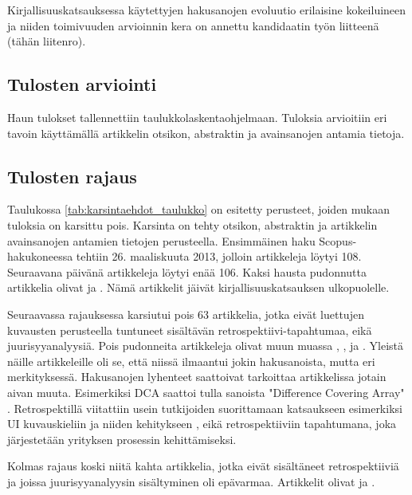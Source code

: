 Kirjallisuuskatsauksessa käytettyjen hakusanojen evoluutio erilaisine kokeiluineen ja niiden toimivuuden arvioinnin kera on annettu kandidaatin työn liitteenä (tähän liitenro).

\subsection{Tulosten arviointi}
Haun tulokset tallennettiin taulukkolaskentaohjelmaan. Tuloksia arvioitiin eri tavoin käyttämällä artikkelin otsikon, abstraktin ja avainsanojen antamia tietoja.
\clearpage

\subsection{Tulosten rajaus}
Taulukossa \ref{tab:karsintaehdot_taulukko} on esitetty perusteet, joiden mukaan tuloksia on karsittu pois. Karsinta on tehty otsikon, abstraktin ja artikkelin avainsanojen antamien tietojen perusteella. Ensimmäinen haku Scopus-hakukoneessa tehtiin 26. maaliskuuta 2013, jolloin artikkeleja löytyi 108. Seuraavana päivänä artikkeleja löytyi enää 106. Kaksi hausta pudonnutta artikkelia olivat \citep{bolosky2007farsite} ja \citep{dreiseitl2005nomographic}. Nämä artikkelit jäivät kirjallisuuskatsauksen ulkopuolelle.

Seuraavassa rajauksessa karsiutui pois 63 artikkelia, jotka eivät luettujen kuvausten perusteella tuntuneet sisältävän retrospektiivi-tapahtumaa, eikä juurisyyanalyysiä. Pois pudonneita artikkeleja olivat muun muassa \citep{yang2012personalized}, \citep{ji2010constructions}, \citep{helms2008retrospective} ja \citep{richardson2006developing}. Yleistä näille artikkeleille oli se, että niissä ilmaantui jokin hakusanoista, mutta eri merkityksessä. Hakusanojen lyhenteet saattoivat tarkoittaa artikkelissa jotain aivan muuta. Esimerkiksi DCA saattoi tulla sanoista "Difference Covering Array" \citep{ji2010constructions}. Retrospektillä viitattiin usein tutkijoiden suorittamaan katsaukseen esimerkiksi UI kuvauskieliin ja niiden kehitykseen \citep{helms2008retrospective}, eikä retrospektiiviin tapahtumana, joka järjestetään yrityksen prosessin kehittämiseksi.

Kolmas rajaus koski niitä kahta artikkelia, jotka eivät sisältäneet retrospektiiviä ja joissa juurisyyanalyysin sisältyminen oli epävarmaa. Artikkelit olivat \citep{anquetil2007software} ja \citep{wang2004strider}.

